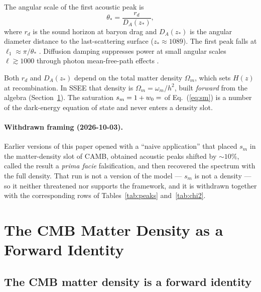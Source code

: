 \documentclass[12pt,a4paper]{article}
\begin{document}
The angular scale of the first acoustic peak is
\begin{equation}
\theta_* = \frac{r_d}{D_A(z_*)},
\end{equation}
where $r_d$ is the sound horizon at baryon drag and $D_A(z_*)$ is the
angular diameter distance to the last-scattering surface ($z_*\approx1089$).
The first peak falls at $\ell_1 \approx \pi/\theta_*$ \citep{HuSugiyama1996,Dodelson2003}.
Diffusion damping suppresses power at small angular scales
$\ell\gtrsim1000$ through photon mean-free-path effects \citep{Silk1968}.

Both $r_d$ and $D_A(z_*)$ depend on the total matter density $\Omega_m$, which sets
$H(z)$ at recombination. In SSEE that density is $\Omega_m=\omega_m/h^2$, built
\emph{forward} from the algebra (Section~\ref{sec:mira}). The saturation
$s_m=1+w_0=\val{S_M_d6}$ of Eq.~(\ref{eq:sm}) is a number of the dark-energy
equation of state and never enters a density slot.

\paragraph{Withdrawn framing (2026-10-03).} Earlier versions of this paper opened
with a ``naive application'' that placed $s_m$ in the matter-density slot of CAMB,
obtained acoustic peaks shifted by ${\sim}10\%$, called the result a
\emph{prima facie} falsification, and then recovered the spectrum with the full
density. That run is not a version of the model --- $s_m$ is not a density --- so
it neither threatened nor supports the framework, and it is withdrawn together
with the corresponding rows of Tables~\ref{tab:peaks} and~\ref{tab:chi2}.

\section{The CMB Matter Density as a Forward Identity}
\label{sec:mira}

\subsection{The CMB matter density is a forward identity}
\end{document}
